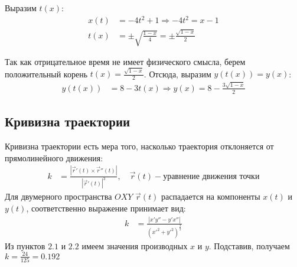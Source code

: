 Выразим $t(x)$:\\
\begin{align}
    x(t) &= -4t^{2} + 1 \Rightarrow -4t^{2} = x - 1 \\
    t(x) &= \pm\sqrt{\frac{1-x}{4}} = \pm\frac{\sqrt{1 - x}}{2}
\end{align}

Так как отрицательное время не имеет физического смысла, берем
положительный корень $t(x) = \frac{\sqrt{1 - x}}{2}$.
Отсюда, выразим $y(t(x)) = y(x)$:\\
\begin{align}
    y(t(x)) &= 8 - 3t(x) \Rightarrow
    y(x) = 8 - \frac{3\sqrt{1 - x}}{2}
\end{align}

\begin{figure}[ht]
    \centering
\end{figure}

\subsection{Кривизна траектории}
Кривизна траектории есть мера того, насколько траектория отклоняется от
прямолинейного движения:
\begin{align}
    k &= \frac{\left|\vec{r}'(t)\times\vec{r}''(t)\right|}{\left|\vec{r}'(t)\right|^{3}},
    \quad\vec{r}(t) - \text{уравнение движения точки}
\end{align}
Для двумерного пространства $OXY$ $\vec{r}(t)$ распадается на компоненты $x(t)$ и $y(t)$,
соответственно выражение принимает вид:
\begin{align}
    k &= \frac{\left|x'y'' - y'x''\right|}{(x'^{2}+y'^{2})^{\frac{3}{2}}}
\end{align}
Из пунктов $2.1$ и $2.2$ имеем значения производных $x$ и $y$.
Подставив, получаем $k = \frac{24}{125} = 0.192$
